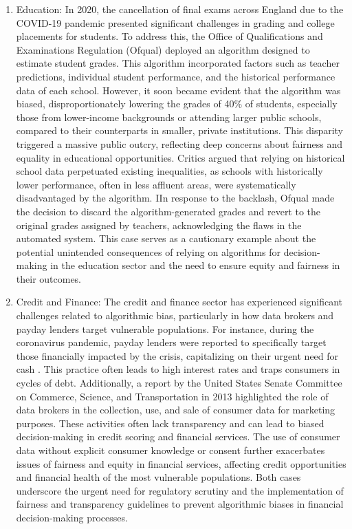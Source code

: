 \documentclass[10pt]{article}
\begin{document}
\begin{enumerate}
    \item Education: In 2020, the cancellation of final exams across England due to the COVID-19 pandemic presented significant challenges in grading and college placements for students. To address this, the Office of Qualifications and Examinations Regulation (Ofqual) deployed an algorithm designed to estimate student grades. This algorithm incorporated factors such as teacher predictions, individual student performance, and the historical performance data of each school. However, it soon became evident that the algorithm was biased, disproportionately lowering the grades of 40\% of students, especially those from lower-income backgrounds or attending larger public schools, compared to their counterparts in smaller, private institutions. This disparity triggered a massive public outcry, reflecting deep concerns about fairness and equality in educational opportunities. Critics argued that relying on historical school data perpetuated existing inequalities, as schools with historically lower performance, often in less affluent areas, were systematically disadvantaged by the algorithm. IIn response to the backlash, Ofqual made the decision to discard the algorithm-generated grades and revert to the original grades assigned by teachers, acknowledging the flaws in the automated system. This case serves as a cautionary example about the potential unintended consequences of relying on algorithms for decision-making in the education sector and the need to ensure equity and fairness in their outcomes.
    \item Credit and Finance: The credit and finance sector has experienced significant challenges related to algorithmic bias, particularly in how data brokers and payday lenders target vulnerable populations. For instance, during the coronavirus pandemic, payday lenders were reported to specifically target those financially impacted by the crisis, capitalizing on their urgent need for cash \cite{jones2020payday}. This practice often leads to high interest rates and traps consumers in cycles of debt. Additionally, a report by the United States Senate Committee on Commerce, Science, and Transportation in 2013 highlighted the role of data brokers in the collection, use, and sale of consumer data for marketing purposes. These activities often lack transparency and can lead to biased decision-making in credit scoring and financial services. The use of consumer data without explicit consumer knowledge or consent further exacerbates issues of fairness and equity in financial services, affecting credit opportunities and financial health of the most vulnerable populations. Both cases underscore the urgent need for regulatory scrutiny and the implementation of fairness and transparency guidelines to prevent algorithmic biases in financial decision-making processes.

\end{enumerate}
\end{document}
